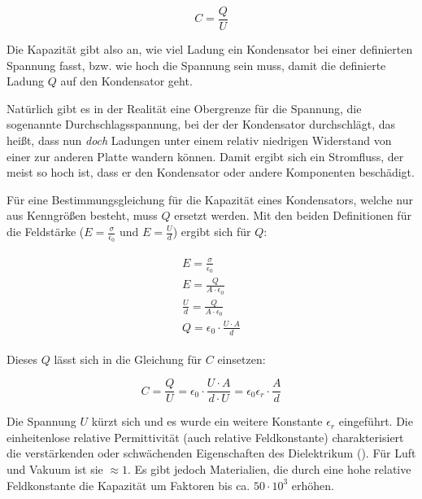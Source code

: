 \begin{equation} \label{eq:kapazitaet}
	C = \frac{Q}{U}
\end{equation}

Die Kapazität gibt also an, wie viel Ladung ein Kondensator bei einer definierten Spannung fasst, bzw. wie hoch die Spannung sein muss, damit die definierte Ladung $Q$ auf den Kondensator \glqq geht\grqq .

\begin{NiceToKnow}
Natürlich gibt es in der Realität eine Obergrenze für die Spannung, die sogenannte \glqq Durchschlagsspannung\grqq , bei der der Kondensator durchschlägt, das heißt, dass nun \emph{doch} Ladungen unter einem relativ niedrigen Widerstand von einer zur anderen Platte wandern können. Damit ergibt sich ein Stromfluss, der meist so hoch ist, dass er den Kondensator oder andere Komponenten beschädigt.
\end{NiceToKnow}

Für eine Bestimmungsgleichung für die Kapazität eines Kondensators, welche nur aus Kenngrößen besteht, muss $Q$ ersetzt werden. Mit den beiden Definitionen für die Feldstärke ($E = \frac{\sigma}{\epsilon_0}$ und $E=\frac{U}{d}$) ergibt sich für $Q$:

\begin{align}
\begin{split}
	E = \frac{\sigma}{\epsilon_0} \\
	E = \frac{Q}{A \cdot \epsilon_0} \\
	\frac{U}{d} = \frac{Q}{A \cdot \epsilon_0} \\
	Q = \epsilon_0 \cdot \frac{U \cdot A}{d}
\end{split}
\end{align}

\noindent Dieses $Q$ lässt sich in die Gleichung für $C$ einsetzen:

\begin{equation} \label{eq:bestimmung_kondensator}
	C = \frac{Q}{U} = \epsilon_0 \cdot \frac{U \cdot A}{d \cdot U} = \epsilon_0 \epsilon_r \cdot \frac{A}{d}
\end{equation}

Die Spannung $U$ kürzt sich und es wurde ein weitere Konstante $\epsilon_r$ eingeführt. Die einheitenlose \glqq relative Permittivität\grqq{}  (auch \glqq relative Feldkonstante\grqq) charakterisiert die verstärkenden oder schwächenden Eigenschaften des Dielektrikum (). Für Luft und Vakuum ist sie $\approx 1$. Es gibt jedoch Materialien, die durch eine hohe relative Feldkonstante die Kapazität um Faktoren bis ca. $50 \cdot 10^3$ erhöhen.

